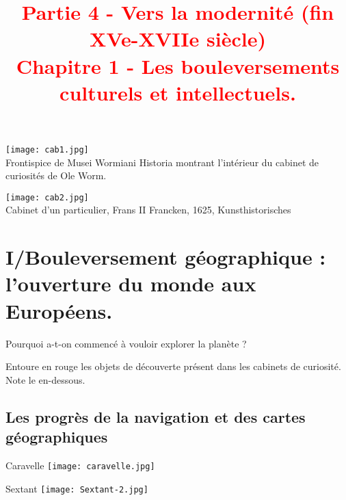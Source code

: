 \documentclass{beamer}
\title{{\textcolor{red}{Partie 4 - Vers la modernité (fin XVe-XVIIe siècle) \\ Chapitre 1 - Les bouleversements culturels et intellectuels.}}}
\begin{document}
\begin{frame}
 \titlepage %
 \end{frame}

\begin{frame}
\texttt{[image: cab1.jpg]} \\
\small Frontispice de Musei Wormiani Historia montrant l'intérieur du cabinet de curiosités de Ole Worm.
\end{frame}

\begin{frame}
\texttt{[image: cab2.jpg]} \\
\small Cabinet d'un particulier, Frans II Francken, 1625, Kunsthistorisches \\
\end{frame}


\begin{frame} 

\end{frame}

\section{I/Bouleversement géographique : l'ouverture du monde aux Européens.} 

Pourquoi a-t-on commencé à vouloir explorer la planète ?

\begin{frame}
Entoure en rouge les objets de découverte présent dans les cabinets de curiosité.
Note le en-dessous.
\end{frame}


\subsection{Les progrès de la navigation et des cartes géographiques}

\begin{frame}
\begin{minipage}{5cm}{Caravelle}
\texttt{[image: caravelle.jpg]}
\end{minipage}
\begin{minipage}{5cm}{Sextant}
\texttt{[image: Sextant-2.jpg]}
\end{minipage}
\end{frame}
\end{document}
